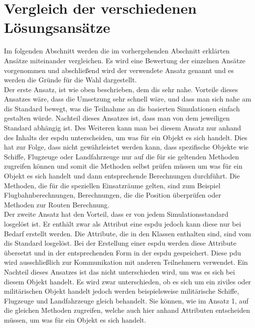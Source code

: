 \section{Vergleich der verschiedenen Lösungsansätze} 
Im folgenden Abschnitt werden die im vorhergehenden Abschnitt erklärten Ansätze miteinander vergleichen. Es wird eine Bewertung der einzelnen Ansätze vorgenommen und abschließend wird der verwendete Ansatz genannt und es werden die Gründe für die Wahl dargestellt.\\
Der erste Ansatz, ist wie oben beschrieben, dem \ac{dis} sehr nahe. Vorteile dieses Ansatzes wäre, dass die Umsetzung sehr schnell wäre, und dass man sich nahe am \ac{dis} Standard bewegt, was die Teilnahme an \ac{dis} basierten Simulationen einfach gestalten würde. Nachteil dieses Ansatzes ist, dass man von dem jeweiligen Standard abhängig ist. Des Weiteren kann man bei diesem Ansatz nur anhand des Inhalts der \ac{espdu} unterscheiden, um was für ein Objekt es sich handelt. Dies hat zur Folge, dass nicht gewährleistet werden kann, dass  spezifische Objekte wie Schiffe, Flugzeuge oder Landfahrzeuge nur auf die für sie geltenden Methoden zugreifen können und somit die Methoden selbst prüfen müssen um was für ein Objekt es sich handelt und dann entsprechende Berechnungen durchführt. Die Methoden, die für die speziellen Einsatzräume gelten, sind zum Beispiel Flugbahnberechnungen, Berechnungen, die die Position überprüfen oder Methoden zur Routen Berechnung.    \\
Der zweite  Ansatz hat den Vorteil, dass er von jedem Simulationsstandard losgelöst ist. Er enthält zwar als Attribut eine \ac{espdu} jedoch kann diese nur bei Bedarf erstellt werden. Die Attribute, die in den Klassen enthalten sind, sind vom \ac{dis} Standard losgelöst. Bei der Erstellung  einer  \ac{espdu} werden diese Attribute übersetzt und in der entsprechenden Form in der \ac{espdu} gespeichert. Diese \ac{pdu} wird ausschließlich zur Kommunikation mit anderen Teilnehmern verwendet. Ein Nachteil dieses Ansatzes ist das nicht unterschieden wird, um was es sich bei diesem Objekt handelt. Es wird zwar unterschieden, ob es sich um ein ziviles oder militärischen Objekt handelt jedoch werden beispielsweise militärische Schiffe, Flugzeuge und Landfahrzeuge gleich behandelt. Sie können, wie im Ansatz 1, auf die gleichen Methoden zugreifen, welche auch hier anhand Attributen entscheiden müssen, um was für ein Objekt es sich handelt. \\
